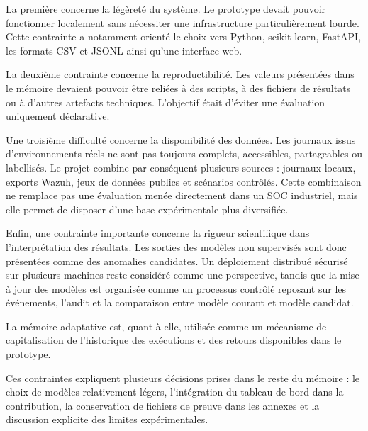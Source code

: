 La première concerne la légèreté du système. Le prototype devait pouvoir fonctionner localement sans nécessiter une infrastructure particulièrement lourde. Cette contrainte a notamment orienté le choix vers Python, scikit-learn, FastAPI, les formats CSV et JSONL ainsi qu'une interface web.

La deuxième contrainte concerne la reproductibilité. Les valeurs présentées dans le mémoire devaient pouvoir être reliées à des scripts, à des fichiers de résultats ou à d'autres artefacts techniques. L'objectif était d'éviter une évaluation uniquement déclarative.

Une troisième difficulté concerne la disponibilité des données. Les journaux issus d'environnements réels ne sont pas toujours complets, accessibles, partageables ou labellisés. Le projet combine par conséquent plusieurs sources : journaux locaux, exports Wazuh, jeux de données publics et scénarios contrôlés. Cette combinaison ne remplace pas une évaluation menée directement dans un SOC industriel, mais elle permet de disposer d'une base expérimentale plus diversifiée.

Enfin, une contrainte importante concerne la rigueur scientifique dans l'interprétation des résultats. Les sorties des modèles non supervisés sont donc présentées comme des anomalies candidates. Un déploiement distribué sécurisé sur plusieurs machines reste considéré comme une perspective, tandis que la mise à jour des modèles est organisée comme un processus contrôlé reposant sur les événements, l'audit et la comparaison entre modèle courant et modèle candidat.

La mémoire adaptative est, quant à elle, utilisée comme un mécanisme de capitalisation de l'historique des exécutions et des retours disponibles dans le prototype.

Ces contraintes expliquent plusieurs décisions prises dans le reste du mémoire : le choix de modèles relativement légers, l'intégration du tableau de bord dans la contribution, la conservation de fichiers de preuve dans les annexes et la discussion explicite des limites expérimentales.
